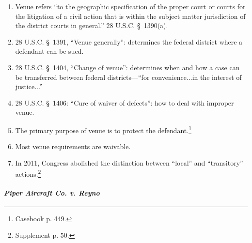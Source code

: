 \begin{enumerate}
    \item Venue refers ``to the geographic specification of the proper court or courts for the litigation of a civil action that is within the subject matter jurisdiction of the district courts in general.'' 28 U.S.C. \S\ 1390(a).
    \item 28 U.S.C. \S\ 1391, ``Venue generally'': determines the federal district where a defendant can be sued.
    \item 28 U.S.C. \S\ 1404, ``Change of venue'': determines when and how a case can be transferred between federal districts---``for convenience...in the interest of justice...''
    \item 28 U.S.C. \S\ 1406: ``Cure of waiver of defects'': how to deal with improper venue.
    \item The primary purpose of venue is to protect the defendant.\footnote{Casebook p. 449.}
    \item Most venue requirements are waivable.
    \item In 2011, Congress abolished the distinction between ``local'' and ``transitory'' actions.\footnote{Supplement p. 50.}
\end{enumerate}

\paragraph{\emph{Piper Aircraft Co. v. Reyno}}


